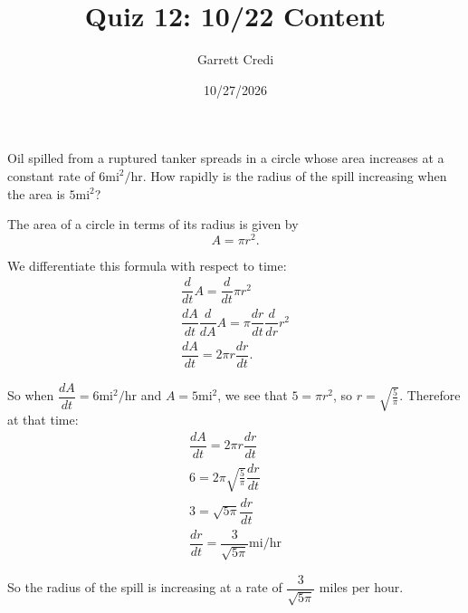 \documentclass[addpoints,12pt]{exam}
\title{Quiz 12: 10/22 Content}
\author{Garrett Credi}
\date{10/27/2026}
\begin{document}
\maketitle

\newpage

\begin{questions}
  \question[5] Oil spilled from a ruptured tanker spreads in a circle whose area increases at a constant rate of $6 \text{mi}^2/\text{hr}$. How rapidly is the radius of the spill increasing when the area is $5 \text{mi}^2$?

  \begin{solution}
    The area of a circle in terms of its radius is given by
    \begin{equation}
      A = \pi r^2.
    \end{equation}

    We differentiate this formula with respect to time:
    \begin{gather}
      \dfrac{d}{dt} A = \dfrac{d}{dt} \pi r^2 \\
      \dfrac{dA}{dt} \dfrac{d}{dA} A = \pi \dfrac{dr}{dt} \dfrac{d}{dr} r^2 \\
      \dfrac{dA}{dt} = 2\pi r \dfrac{dr}{dt}.
    \end{gather}

    So when $\dfrac{dA}{dt} = 6 \text{mi}^2/\text{hr}$ and $A = 5 \text{mi}^2$,
    we see that $5 = \pi r^2$, so $r = \sqrt{\frac{5}{\pi}}$. Therefore
    at that time:
    \begin{gather}
      \dfrac{dA}{dt} = 2 \pi r \dfrac{dr}{dt} \\
      6 = 2 \pi \sqrt{\frac{5}{\pi}} \dfrac{dr}{dt} \\
      3 = \sqrt{5\pi} \dfrac{dr}{dt} \\
      \dfrac{dr}{dt} = \dfrac{3}{\sqrt{5\pi}} \text{mi}/\text{hr}
    \end{gather}

    So the radius of the spill is increasing at a rate of $\dfrac{3}{\sqrt{5\pi}}$ miles per hour.
  \end{solution}
\end{questions}
\end{document}
